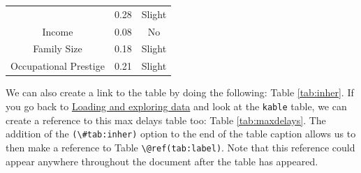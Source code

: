\documentclass [11pt, proquest] {uwthesis}[2015/03/03]
\begin{document}
\begin{longtable}[]{@{}ccc@{}}
\begin{minipage}[t]{0.29\columnwidth}
\end{minipage} & \begin{minipage}[t]{0.47\columnwidth}\centering\strut
0.28\strut
\end{minipage} & \begin{minipage}[t]{0.16\columnwidth}\centering\strut
Slight\strut
\end{minipage}\tabularnewline
\begin{minipage}[t]{0.29\columnwidth}\centering\strut
Income\strut
\end{minipage} & \begin{minipage}[t]{0.47\columnwidth}\centering\strut
0.08\strut
\end{minipage} & \begin{minipage}[t]{0.16\columnwidth}\centering\strut
No\strut
\end{minipage}\tabularnewline
\begin{minipage}[t]{0.29\columnwidth}\centering\strut
Family Size\strut
\end{minipage} & \begin{minipage}[t]{0.47\columnwidth}\centering\strut
0.18\strut
\end{minipage} & \begin{minipage}[t]{0.16\columnwidth}\centering\strut
Slight\strut
\end{minipage}\tabularnewline
\begin{minipage}[t]{0.29\columnwidth}\centering\strut
Occupational Prestige\strut
\end{minipage} & \begin{minipage}[t]{0.47\columnwidth}\centering\strut
0.21\strut
\end{minipage} & \begin{minipage}[t]{0.16\columnwidth}\centering\strut
Slight\strut
\end{minipage}\tabularnewline
\bottomrule
\end{longtable}
We can also create a link to the table by doing the following: Table
\ref{tab:inher}. If you go back to
\protect\hyperlink{loading-and-exploring-data}{Loading and exploring
data} and look at the \texttt{kable} table, we can create a reference to
this max delays table too: Table \ref{tab:maxdelays}. The addition of
the \texttt{(\textbackslash{}\#tab:inher)} option to the end of the
table caption allows us to then make a reference to Table
\texttt{\textbackslash{}@ref(tab:label)}. Note that this reference could
appear anywhere throughout the document after the table has appeared.
\end{document}
